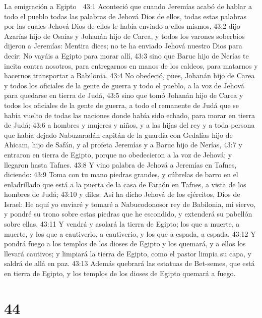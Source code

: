 La emigración a Egipto  

43:1 Aconteció que cuando Jeremías acabó de hablar a todo el pueblo todas las palabras de Jehová Dios de ellos, todas estas palabras por las cuales Jehová Dios de ellos le había enviado a ellos mismos,  
43:2 dijo Azarías hijo de Osaías y Johanán hijo de Carea, y todos los varones soberbios dijeron a Jeremías: Mentira dices; no te ha enviado Jehová nuestro Dios para decir: No vayáis a Egipto para morar allí,  
43:3 sino que Baruc hijo de Nerías te incita contra nosotros, para entregarnos en manos de los caldeos, para matarnos y hacernos transportar a Babilonia.  
43:4 No obedeció, pues, Johanán hijo de Carea y todos los oficiales de la gente de guerra y todo el pueblo, a la voz de Jehová para quedarse en tierra de Judá,  
43:5 sino que tomó Johanán hijo de Carea y todos los oficiales de la gente de guerra, a todo el remanente de Judá que se había vuelto de todas las naciones donde había sido echado, para morar en tierra de Judá;  
43:6 a hombres y mujeres y niños, y a las hijas del rey y a toda persona que había dejado Nabuzaradán capitán de la guardia con Gedalías hijo de Ahicam, hijo de Safán, y al profeta Jeremías y a Baruc hijo de Nerías,  
43:7 y entraron en tierra de Egipto, porque no obedecieron a la voz de Jehová; y llegaron hasta Tafnes.  
43:8 Y vino palabra de Jehová a Jeremías en Tafnes, diciendo:  
43:9 Toma con tu mano piedras grandes, y cúbrelas de barro en el enladrillado que está a la puerta de la casa de Faraón en Tafnes, a vista de los hombres de Judá;  
43:10 y diles: Así ha dicho Jehová de los ejércitos, Dios de Israel: He aquí yo enviaré y tomaré a Nabucodonosor rey de Babilonia, mi siervo, y pondré su trono sobre estas piedras que he escondido, y extenderá su pabellón sobre ellas.  
43:11 Y vendrá y asolará la tierra de Egipto; los que a muerte, a muerte, y los que a cautiverio, a cautiverio, y los que a espada, a espada.  
43:12 Y pondrá fuego a los templos de los dioses de Egipto y los quemará, y a ellos los llevará cautivos; y limpiará la tierra de Egipto, como el pastor limpia su capa, y saldrá de allá en paz.  
43:13 Además quebrará las estatuas de Bet-semes, que está en tierra de Egipto, y los templos de los dioses de Egipto quemará a fuego.  

\chapter{44}

